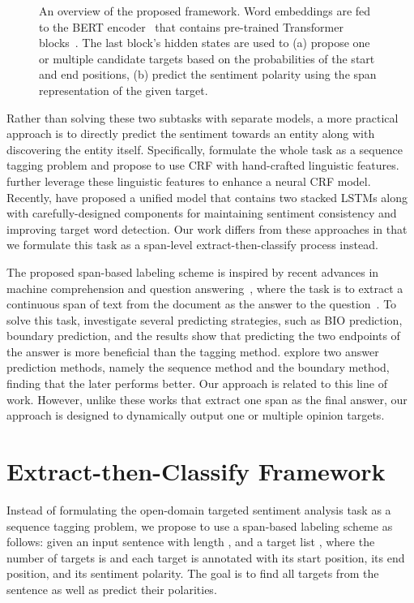 \documentclass[11pt,a4paper]{article}
\begin{document}
\begin{figure*}
  \centering
  \hspace{0.5in}
\caption{An overview of the proposed framework. Word embeddings are fed to the BERT encoder~\cite{devlin2018bert} that contains  pre-trained Transformer blocks~\cite{vaswani2017attention}. The last block's hidden states are used to (a) propose one or multiple candidate targets based on the probabilities of the start and end positions, (b) predict the sentiment polarity using the span representation of the given target.}
\label{fig:overview} \end{figure*}

Rather than solving these two subtasks with separate models, a more practical approach is to directly predict the sentiment towards an entity along with discovering the entity itself.
Specifically, \citet{mitchell2013open} formulate the whole task as a sequence tagging problem and propose to use CRF with hand-crafted linguistic features.
\citet{zhang2015neural} further leverage these linguistic features to enhance a neural CRF model.
Recently, \citet{li2018unified} have proposed a unified model that contains two stacked LSTMs along with carefully-designed components for maintaining sentiment consistency and improving target word detection.
Our work differs from these approaches in that we formulate this task as a span-level extract-then-classify process instead.

The proposed span-based labeling scheme is inspired by recent advances in machine comprehension and question answering~\cite{seo2016bidirectional,hu2017reinforced}, where the task is to extract a continuous span of text from the document as the answer to the question~\cite{Rajpurkar16}.
To solve this task, \citet{lee2016learning} investigate several predicting strategies, such as BIO prediction, boundary prediction, and the results show that predicting the two endpoints of the answer is more beneficial than the tagging method.
\citet{wang2016machine} explore two answer prediction methods, namely the sequence method and the boundary method, finding that the later performs better.
Our approach is related to this line of work. However, unlike these works that extract one span as the final answer, our approach is designed to dynamically output one or multiple opinion targets.
 \section{Extract-then-Classify Framework}
Instead of formulating the open-domain targeted sentiment analysis task as a sequence tagging problem, we propose to use a span-based labeling scheme as follows: 
given an input sentence  with length , and a target list , where the number of targets is  and each target  is annotated with its start position, its end position, and its sentiment polarity.
The goal is to find all targets from the sentence as well as predict their polarities.
\end{document}

